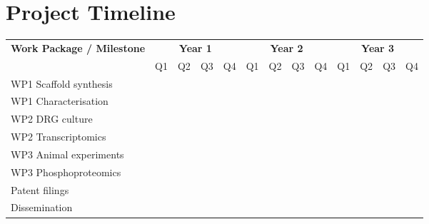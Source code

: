 \section{Project Timeline}

\vspace{4pt}

\noindent
\begin{tabular}{@{}lcccccccccccc@{}}
\toprule
\rowcolor{ukriblue}
\color{white}\textbf{Work Package / Milestone} &
\multicolumn{4}{c}{\color{white}\textbf{Year 1}} &
\multicolumn{4}{c}{\color{white}\textbf{Year 2}} &
\multicolumn{4}{c}{\color{white}\textbf{Year 3}} \\
\rowcolor{ukriblue}
\color{white} &
\color{white}Q1 & \color{white}Q2 & \color{white}Q3 & \color{white}Q4 &
\color{white}Q1 & \color{white}Q2 & \color{white}Q3 & \color{white}Q4 &
\color{white}Q1 & \color{white}Q2 & \color{white}Q3 & \color{white}Q4 \\
\midrule
\rowcolor{ukrigray}
WP1 Scaffold synthesis &
\cellcolor{ukriblue!60} & \cellcolor{ukriblue!60} & \cellcolor{ukriblue!60} &
\cellcolor{ukriblue!60} & \cellcolor{ukriblue!60} & \cellcolor{ukriblue!60} &
 &  &  &  &  &  \\
\rowcolor{white}
WP1 Characterisation &
 & \cellcolor{ukriblue!40} & \cellcolor{ukriblue!40} & \cellcolor{ukriblue!40} &
\cellcolor{ukriblue!40} & \cellcolor{ukriblue!40} & \cellcolor{ukriblue!40} &
 &  &  &  &  \\
\rowcolor{ukrigray}
WP2 DRG culture &
 & \cellcolor{ukripink!50} & \cellcolor{ukripink!50} & \cellcolor{ukripink!50} &
\cellcolor{ukripink!50} & \cellcolor{ukripink!50} & \cellcolor{ukripink!50} &
\cellcolor{ukripink!50} &  &  &  &  \\
\rowcolor{white}
WP2 Transcriptomics &
 &  &  & \cellcolor{ukripink!40} & \cellcolor{ukripink!40} &
\cellcolor{ukripink!40} & \cellcolor{ukripink!40} & \cellcolor{ukripink!40} &
 &  &  &  \\
\rowcolor{ukrigray}
WP3 Animal experiments &
 &  &  &  &  &  & \cellcolor{ukricyan!60} & \cellcolor{ukricyan!60} &
\cellcolor{ukricyan!60} & \cellcolor{ukricyan!60} & \cellcolor{ukricyan!60} & \\
\rowcolor{white}
WP3 Phosphoproteomics &
 &  &  &  &  &  &  &  &
\cellcolor{ukricyan!40} & \cellcolor{ukricyan!40} & \cellcolor{ukricyan!40} & \\
\rowcolor{ukrigray}
Patent filings &
 &  &  &  &  & \cellcolor{ukripink!70} &  &  &  &  &
\cellcolor{ukripink!70} &  \\
\rowcolor{white}
Dissemination &
 &  &  &  &  &  &  & \cellcolor{ukriblue!30} &
\cellcolor{ukriblue!30} & \cellcolor{ukriblue!30} & \cellcolor{ukriblue!30} &
\cellcolor{ukriblue!30} \\
\bottomrule
\end{tabular}

\bigskip


